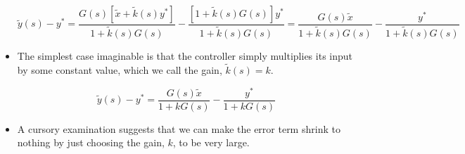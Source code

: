 \documentclass{article}
\begin{document}
\begin{itemize}
\[ \tilde{y}(s) - y^* = \frac{G(s) \left[ \tilde{x} + \tilde{k}(s) y^*  \right]}{1 + \tilde{k}(s)G(s)} - \frac{\left[ 1 + \tilde{k}(s)G(s) \right] y^*}{1 + \tilde{k}(s) G(s) } = \frac{G(s) \tilde{x}}{1 + \tilde{k}(s)G(s)} - \frac{y^*}{1 + \tilde{k}(s)G(s)}  \]

\item The simplest case imaginable is that the controller simply multiplies its input by some constant value, which we call the gain, $\tilde{k}(s) = k$.

\[ \tilde{y}(s) - y^* = \frac{G(s) \tilde{x}}{1 + kG(s)} - \frac{y^*}{1 + kG(s)}  \]

\item A cursory examination suggests that we can make the error term shrink to nothing by just choosing the gain, $k$, to be very large.
\end{itemize}
\end{document}
